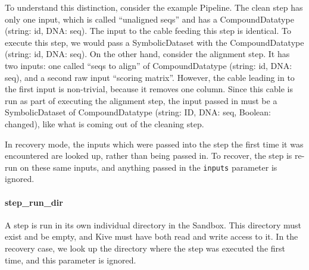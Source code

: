 \documentclass[12pt]{article}
\newcommand{\code}[1]{\texttt{#1}}
\begin{document}
To understand this distinction, consider the example Pipeline. The clean step
has only one input, which is called ``unaligned seqs'' and has a
CompoundDatatype (string: id, DNA: seq). The input to the cable feeding this
step is identical.  To execute this step, we would pass a SymbolicDataset with
the CompoundDatatype (string: id, DNA: seq). On the other hand, consider the
alignment step. It has two inputs: one called ``seqs to align'' of
CompoundDatatype (string: id, DNA: seq), and a second raw input ``scoring
matrix''. However, the cable leading in to the first input is non-trivial,
because it removes one column. Since this cable is run as part of executing the
alignment step, the input passed in must be a SymbolicDataset of
CompoundDatatype (string: ID, DNA: seq, Boolean: changed), like what is coming
out of the cleaning step.

In recovery mode, the inputs which were passed into the step the first time it
was encountered are looked up, rather than being passed in. To recover, the
step is re-run on these same inputs, and anything passed in the \code{inputs}
parameter is ignored.

\paragraph*{step\_run\_dir}

A step is run in its own individual directory in the Sandbox. This directory
must exist and be empty, and Kive must have both read and write access to
it. In the recovery case, we look up the directory where the step was executed
the first time, and this parameter is ignored.
\end{document}
